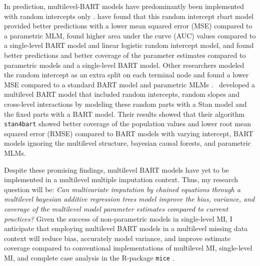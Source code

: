\documentclass[10pt, a4paper, titlepage]{article}
\begin{document}
In prediction, multilevel-BART models have predominantly been implemented with random intercepts only \citep{chen2020, wagner2020, tan2016, wundervald2022}. \citet{wagner2020} have found that this random intercept rbart model provided better predictions with a lower mean squared error (MSE) compared to a parametric MLM, \citet{tan2016} found higher area under the curve (AUC) values compared to a single-level BART model and linear logistic random intercept model, and \citet{chen2020} found better predictions and better coverage of the parameter estimates compared to parametric models and a single-level BART model. Other researchers modeled the random intercept as an extra split on each terminal node and found a lower MSE compared to a standard BART model and parametric MLMs \citep{wundervald2022}.~\citet{dorie2022} developed a multilevel BART model that included random intercepts, random slopes and cross-level interactions by modeling these random parts with a Stan \citep{lee2017} model and the fixed parts with a BART model. Their results showed that their algorithm \texttt{stan4bart} showed better coverage of the population values and lower root mean squared error (RMSE) compared to BART models with varying intercept, BART models ignoring the multilevel structure, bayesian causal forests, and parametric MLMs. 



Despite these promising findings, multilevel BART models have yet to be implemented in a multilevel multiple imputation context. Thus, my research question will be: \textit{Can multivariate imputation by chained equations through a multilevel bayesian additive regression trees model improve the bias, variance, and coverage of the multilevel model parameter estimates compared to current practices?} Given the success of non-parametric models in single-level MI, I anticipate that employing multilevel BART models in a multilevel missing data context will reduce bias, accurately model variance, and improve estimate coverage compared to conventional implementations of multilevel MI, single-level MI, and complete case analysis in the R-package \texttt{mice} \citep{buuren2011}. 
\end{document}
